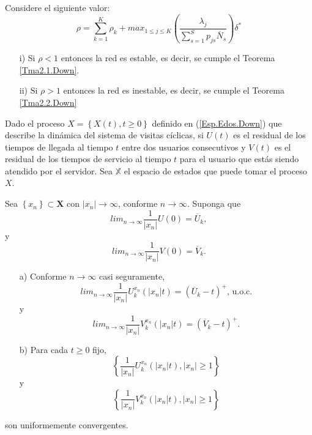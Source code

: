 \begin{Teo}\label{Tma2.3.Down}
Considere el siguiente valor:
\begin{equation}\label{Eq.Rho.1serv}
\rho=\sum_{k=1}^{K}\rho_{k}+max_{1\leq j\leq K}\left(\frac{\lambda_{j}}{\sum_{s=1}^{S}p_{js}\overline{N}_{s}}\right)\delta^{*}
\end{equation}
\begin{itemize}
\item[i)] Si $\rho<1$ entonces la red es estable, es decir, se
cumple el Teorema \ref{Tma2.1.Down}.

\item[ii)] Si $\rho>1$ entonces la red es inestable, es decir, se
cumple el Teorema \ref{Tma2.2.Down}
\end{itemize}
\end{Teo}




Dado el proceso $X=\left\{X\left(t\right),t\geq0\right\}$ definido
en (\ref{Esp.Edos.Down}) que describe la din\'amica del sistema de
visitas c\'iclicas, si $U\left(t\right)$ es el residual de los
tiempos de llegada al tiempo $t$ entre dos usuarios consecutivos y
$V\left(t\right)$ es el residual de los tiempos de servicio al
tiempo $t$ para el usuario que est\'as siendo atendido por el
servidor. Sea $\mathbb{X}$ el espacio de estados que puede tomar
el proceso $X$.


\begin{Lema}\label{Lema.4.3}
Sea $\left\{x_{n}\right\}\subset \mathbf{X}$ con
$|x_{n}|\rightarrow\infty$, conforme $n\rightarrow\infty$. Suponga
que
\[lim_{n\rightarrow\infty}\frac{1}{|x_{n}|}U\left(0\right)=\overline{U}_{k},\]
y
\[lim_{n\rightarrow\infty}\frac{1}{|x_{n}|}V\left(0\right)=\overline{V}_{k}.\]
\begin{itemize}
\item[a)] Conforme $n\rightarrow\infty$ casi seguramente,
\[lim_{n\rightarrow\infty}\frac{1}{|x_{n}|}U^{x_{n}}_{k}\left(|x_{n}|t\right)=\left(\overline{U}_{k}-t\right)^{+}\textrm{, u.o.c.}\]
y
\[lim_{n\rightarrow\infty}\frac{1}{|x_{n}|}V^{x_{n}}_{k}\left(|x_{n}|t\right)=\left(\overline{V}_{k}-t\right)^{+}.\]

\item[b)] Para cada $t\geq0$ fijo,
\[\left\{\frac{1}{|x_{n}|}U^{x_{n}}_{k}\left(|x_{n}|t\right),|x_{n}|\geq1\right\}\]
y
\[\left\{\frac{1}{|x_{n}|}V^{x_{n}}_{k}\left(|x_{n}|t\right),|x_{n}|\geq1\right\}\]
\end{itemize}
son uniformemente convergentes.
\end{Lema}

